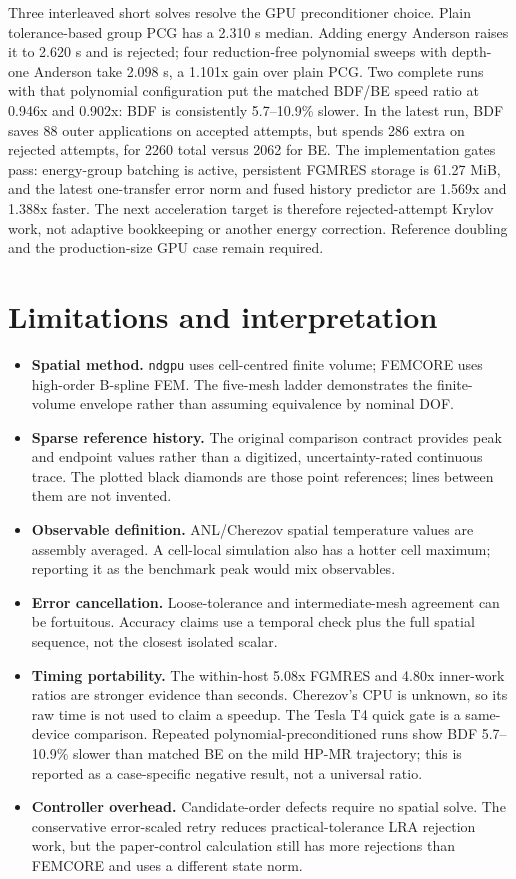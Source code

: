 \documentclass[10pt]{article}
\newcommand{\ndgpu}{\texttt{ndgpu}}
\begin{document}
Three interleaved short solves resolve the GPU preconditioner choice. Plain
tolerance-based group PCG has a 2.310 s median. Adding energy Anderson raises
it to 2.620 s and is rejected; four reduction-free polynomial sweeps with
depth-one Anderson take 2.098 s, a 1.101x gain over plain PCG. Two complete
runs with that polynomial configuration put the matched BDF/BE speed ratio at
0.946x and 0.902x: BDF is consistently 5.7--10.9\% slower. In the latest run,
BDF saves 88 outer applications on accepted attempts, but spends 286 extra on
rejected attempts, for 2260 total versus 2062 for BE. The implementation gates
pass: energy-group batching is active, persistent FGMRES storage is 61.27 MiB,
and the latest one-transfer error norm and fused history predictor are 1.569x
and 1.388x faster. The next acceleration target is therefore rejected-attempt
Krylov work, not adaptive bookkeeping or another energy correction. Reference
doubling and the production-size GPU case remain required.

\clearpage

\section{Limitations and interpretation}

\begin{itemize}
\item \textbf{Spatial method.} \ndgpu{} uses cell-centred finite volume;
  FEMCORE uses high-order B-spline FEM. The five-mesh ladder demonstrates the
  finite-volume envelope rather than assuming equivalence by nominal DOF.
\item \textbf{Sparse reference history.} The original comparison contract
  provides peak and endpoint values rather than a digitized, uncertainty-rated
  continuous trace. The plotted black diamonds are those point references;
  lines between them are not invented.
\item \textbf{Observable definition.} ANL/Cherezov spatial temperature values
  are assembly averaged. A cell-local simulation also has a hotter cell
  maximum; reporting it as the benchmark peak would mix observables.
\item \textbf{Error cancellation.} Loose-tolerance and intermediate-mesh
  agreement can be fortuitous. Accuracy claims use a temporal check plus the
  full spatial sequence, not the closest isolated scalar.
\item \textbf{Timing portability.} The within-host 5.08x FGMRES and 4.80x
  inner-work ratios are stronger evidence than seconds. Cherezov's CPU is
  unknown, so its raw time is not used to claim a speedup. The Tesla T4 quick
  gate is a same-device comparison. Repeated polynomial-preconditioned runs
  show BDF 5.7--10.9\% slower than matched BE on the mild HP-MR trajectory;
  this is reported as a case-specific negative result, not a universal ratio.
\item \textbf{Controller overhead.} Candidate-order defects require no spatial
  solve. The conservative error-scaled retry reduces practical-tolerance LRA
  rejection work, but the paper-control calculation still has more rejections
  than FEMCORE and uses a different state norm.
\end{itemize}
\end{document}
